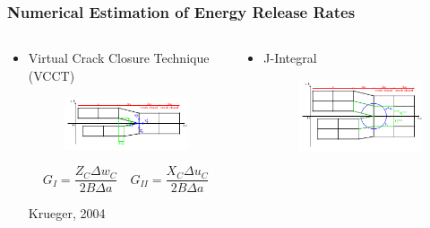 \documentclass[first,firstsupp,lastsupp,last,hyperref,table]{ETHclass}
\begin{document}
\begin{frame}
\end{frame}

\begin{frame}
\frametitle{\small Numerical Estimation of Energy Release Rates}
\vspace{-0.4cm}
\centering
\scriptsize
\begin{columns}
\begin{column}{0.5\textwidth}
\centering
\vspace*{-1.4cm}
\begin{itemize}[label=]
\item Virtual Crack Closure Technique (VCCT)
\begin{figure}
\includegraphics[width=\columnwidth]{VCCT.pdf}
  \label{fig:vcct}
\end{figure}

\begin{equation*}
G_{I}=\frac{Z_{C}\Delta w_{C}}{2B\Delta a}\quad G_{II}=\frac{X_{C}\Delta u_{C}}{2B\Delta a}
\end{equation*}

Krueger, 2004
\end{itemize}
\end{column}
\begin{column}{0.5\textwidth}
\centering
\begin{itemize}[label=]
\item J-Integral

\begin{figure}
\includegraphics[width=\columnwidth]{J-integral.pdf}
  \label{fig:jintegral}
\end{figure}


\end{itemize}
\end{column}
\end{columns}
\end{frame}
\end{document}
